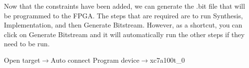
Now that the constraints have been added, we can generate the .bit file that will be
programmed to the FPGA.
The steps that are required are to run Synthesis, Implementation, and then Generate Bitstream.
However, as a shortcut, you can click on Generate Bitstream and it will automatically run the
other steps if they need to be run.

Open target$\rightarrow$Auto connect
Program device$\rightarrow$xc7a100t\_0


